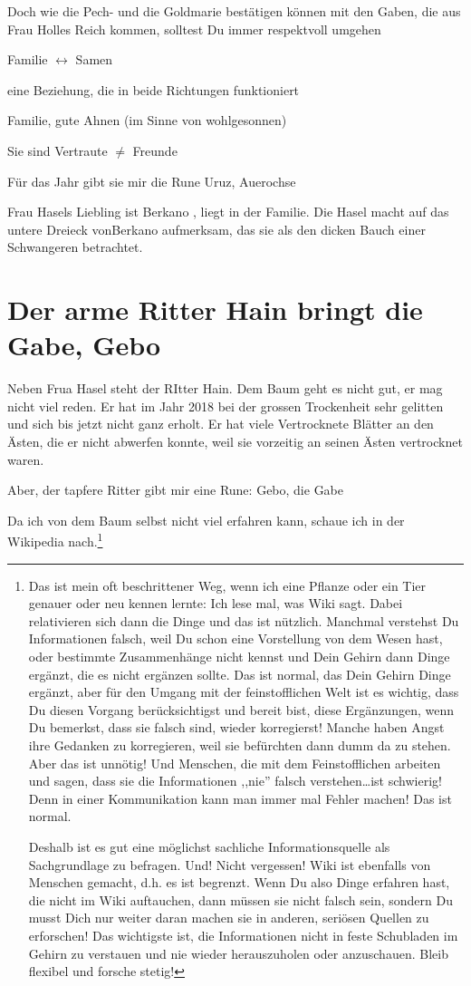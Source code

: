 \documentclass[11pt,titlepage,a5paper]{book}
\begin{document}
Doch wie die Pech- und die Goldmarie bestätigen können mit den Gaben, die aus Frau Holles Reich kommen, solltest Du immer respektvoll umgehen 

Familie $\leftrightarrow$ Samen

eine Beziehung, die in beide Richtungen funktioniert

Familie, gute Ahnen (im Sinne von wohlgesonnen)

Sie sind Vertraute $\neq$ Freunde

Für das Jahr gibt sie mir die Rune Uruz, Auerochse 

Frau Hasels Liebling ist Berkano , liegt in der Familie. Die Hasel macht auf das untere Dreieck vonBerkano aufmerksam, das sie als den dicken Bauch einer Schwangeren betrachtet.

\section*{Der arme Ritter Hain bringt die Gabe, Gebo  }

Neben Frua Hasel steht der RItter Hain. Dem Baum geht es nicht gut, er mag nicht viel reden. Er hat im Jahr 2018 bei der grossen Trockenheit sehr gelitten und sich bis jetzt nicht ganz erholt. Er hat viele Vertrocknete Blätter an den Ästen, die er nicht abwerfen konnte, weil sie vorzeitig an seinen Ästen vertrocknet waren.

Aber, der tapfere Ritter gibt mir eine Rune: Gebo, die Gabe 

Da ich von dem Baum selbst nicht viel erfahren kann, schaue ich in der Wikipedia nach.\footnote{Das ist mein oft beschrittener Weg, wenn ich eine Pflanze oder ein Tier genauer oder neu kennen lernte: Ich lese mal, was Wiki sagt. Dabei relativieren sich dann die Dinge und das ist nützlich. Manchmal verstehst Du Informationen falsch, weil Du schon eine Vorstellung von dem Wesen hast, oder bestimmte Zusammenhänge nicht kennst und Dein Gehirn dann Dinge ergänzt, die es nicht ergänzen sollte. Das ist normal, das Dein Gehirn Dinge ergänzt, aber für den Umgang mit der feinstofflichen Welt ist es wichtig, dass Du diesen Vorgang berücksichtigst und bereit bist, diese Ergänzungen, wenn Du bemerkst, dass sie falsch sind, wieder korregierst! Manche haben Angst ihre Gedanken zu korregieren, weil sie befürchten dann dumm da zu stehen. Aber das ist unnötig! Und Menschen, die mit dem Feinstofflichen arbeiten und sagen, dass sie die Informationen ,,nie'' falsch verstehen\dots ist schwierig! Denn in einer Kommunikation kann man immer mal Fehler machen! Das ist normal.

Deshalb ist es gut eine möglichst sachliche Informationsquelle als Sachgrundlage zu befragen. Und! Nicht vergessen! Wiki ist ebenfalls von Menschen gemacht, d.h. es ist begrenzt. Wenn Du also Dinge erfahren hast, die nicht im Wiki auftauchen, dann müssen sie nicht falsch sein, sondern Du musst Dich nur weiter daran machen sie in anderen, seriösen Quellen zu erforschen! Das wichtigste ist, die Informationen nicht in feste Schubladen im Gehirn zu verstauen und nie wieder herauszuholen oder anzuschauen. Bleib flexibel und forsche stetig!}
\end{document}
